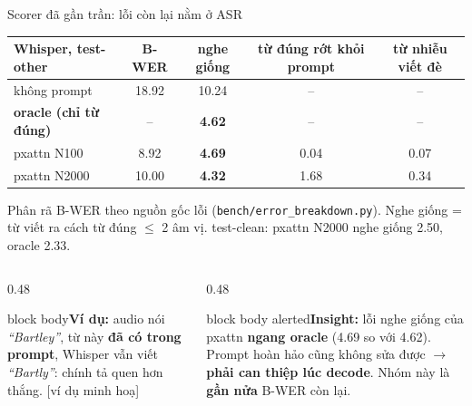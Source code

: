 \documentclass[aspectratio=169,xcolor=table]{beamer}
\newcommand{\hi}[1]{\textcolor{Primary}{\textbf{#1}}}
\newcommand{\src}[1]{{\tiny\color{TextGray}[#1]}}
\newcommand{\ra}{$\rightarrow$}
\newcommand{\nbox}[2][block body]{\begin{beamercolorbox}[sep=0.45em,rounded=true]{#1}\footnotesize #2\end{beamercolorbox}}
\begin{document}
\begin{frame}{Scorer đã gần trần: lỗi còn lại nằm ở ASR}
\centering\scriptsize\setlength{\tabcolsep}{4pt}
\begin{tabular}{lcccc}
\toprule
Whisper, test-other & B-WER & \textbf{nghe giống} & từ đúng rớt khỏi prompt & từ nhiễu viết đè\\
\midrule
không prompt & 18.92 & 10.24 & -- & --\\
\textbf{oracle (chỉ từ đúng)} & -- & \textbf{4.62} & -- & --\\
pxattn N100 & 8.92 & \textbf{4.69} & 0.04 & 0.07\\
pxattn N2000 & 10.00 & \textbf{4.32} & 1.68 & 0.34\\
\bottomrule
\end{tabular}\par
\vspace{0.05cm}
{\scriptsize\color{TextGray} Phân rã B-WER theo nguồn gốc lỗi (\texttt{bench/error\_breakdown.py}). Nghe giống = từ viết ra cách từ đúng $\leq$ 2 âm vị. test-clean: pxattn N2000 nghe giống 2.50, oracle 2.33.}\par
\vspace{0.25cm}\raggedright
\begin{columns}[T]
\begin{column}{0.48\textwidth}
\nbox{\textbf{Ví dụ:} audio nói \textit{``Bartley''}, từ này \textbf{đã có trong prompt}, Whisper vẫn viết \textit{``Bartly''}: chính tả quen hơn thắng. \src{ví dụ minh hoạ}}
\end{column}
\begin{column}{0.48\textwidth}
\nbox[block body alerted]{\textbf{Insight:} lỗi nghe giống của pxattn \textbf{ngang oracle} (4.69 so với 4.62). Prompt hoàn hảo cũng không sửa được \ra{} \hi{phải can thiệp lúc decode}. Nhóm này là \textbf{gần nửa} B-WER còn lại.}
\end{column}
\end{columns}
\end{frame}
\end{document}
